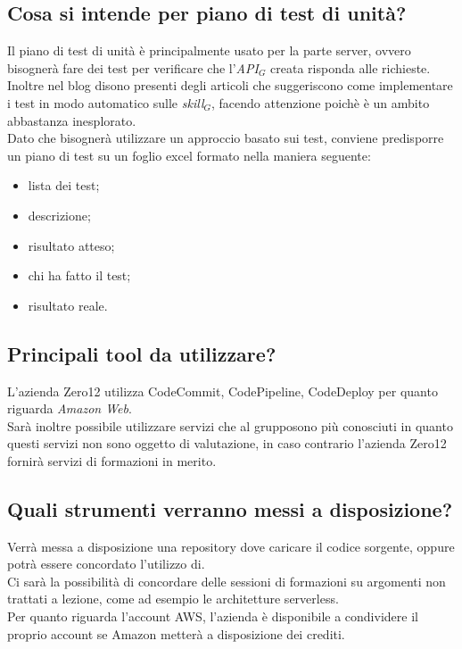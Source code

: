 \documentclass[a4paper,12pt]{article}
\begin{document}
	\subsection{Cosa si intende per piano di test di unità?}
	Il piano di test di unità è principalmente usato per la parte server, ovvero bisognerà fare dei test per verificare che l'\textit{API$_{G}$} creata risponda alle richieste. \\
	Inoltre nel blog disono presenti degli articoli che suggeriscono come implementare i test in modo  automatico sulle \textit{skill$_{G}$}, facendo attenzione poichè è un ambito abbastanza inesplorato. \\
	Dato che bisognerà utilizzare un approccio basato sui test, conviene predisporre un piano di test su un foglio excel formato nella maniera seguente:
	\begin{itemize}
		\item lista dei test;
		\item descrizione;
		\item risultato atteso;
		\item chi ha fatto il test;
		\item risultato reale.
	\end{itemize}
	
	\subsection{Principali tool da utilizzare?}
	L'azienda Zero12 utilizza CodeCommit, CodePipeline, CodeDeploy per quanto riguarda \textit{Amazon Web}. \\
	Sarà inoltre possibile utilizzare servizi che al grupposono più conosciuti in quanto questi servizi non sono oggetto di valutazione, in caso contrario l'azienda Zero12 fornirà servizi di formazioni in merito.
	
	\subsection{Quali strumenti verranno messi a disposizione?}
	Verrà messa a disposizione una repository dove caricare il codice sorgente, oppure potrà essere concordato l'utilizzo di. \\
	Ci sarà la possibilità di concordare delle sessioni di formazioni su argomenti non trattati a lezione, come ad esempio le architetture serverless. \\
	Per quanto riguarda l'account AWS, l'azienda è disponibile a condividere il proprio account se Amazon metterà a disposizione dei crediti.	
	\label{LastPage}
\end{document}
